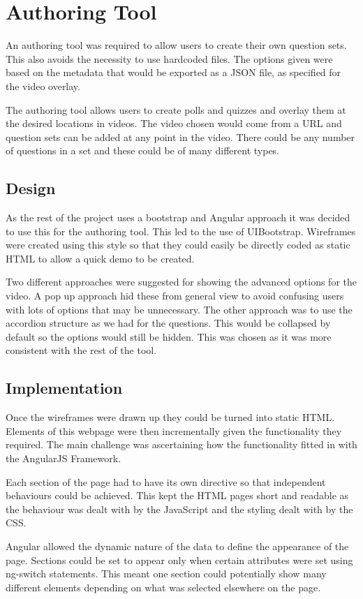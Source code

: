 \chapter{Authoring Tool} 
\label{Chapter:Authoring Tool}
An authoring tool was required to allow users to create their own question sets. This also avoids the necessity to use hardcoded files. The options given were based on the metadata that would be exported as a JSON file, as specified for the video overlay.

The authoring tool allows users to create polls and quizzes and overlay them at the desired locations in videos. The video chosen would come from a URL and question sets can be added at any point in the video. There could be any number of questions in a set and these could be of many different types.
\section{Design} 
\label{Section:Design}
As the rest of the project uses a bootstrap and Angular approach it was decided to use this for the authoring tool. This led to the use of UIBootstrap. Wireframes were created using this style so that they could easily be directly coded as static HTML to allow a quick demo to be created. 

Two different approaches were suggested for showing the advanced options for the video. A pop up approach hid these from general view to avoid confusing users with lots of options that may be unnecessary. The other approach was to use the accordion structure as we had for the questions. This would be collapsed by default so the options would still be hidden. This was chosen as it was more consistent with the rest of the tool.

\section{Implementation}
\label{Section:Implementation}
Once the wireframes were drawn up they could be turned into static HTML. Elements of this webpage were then incrementally given the functionality they required. The main challenge was ascertaining how the functionality fitted in with the AngularJS Framework. 

Each section of the page had to have its own directive so that independent behaviours could be achieved. This kept the HTML pages short and readable as the behaviour was dealt with by the JavaScript and the styling dealt with by the CSS.

Angular allowed the dynamic nature of the data to define the appearance of the page. Sections could be set to appear only when certain attributes were set using ng-switch statements. This meant one section could potentially show many different elements depending on what was selected elsewhere on the page.